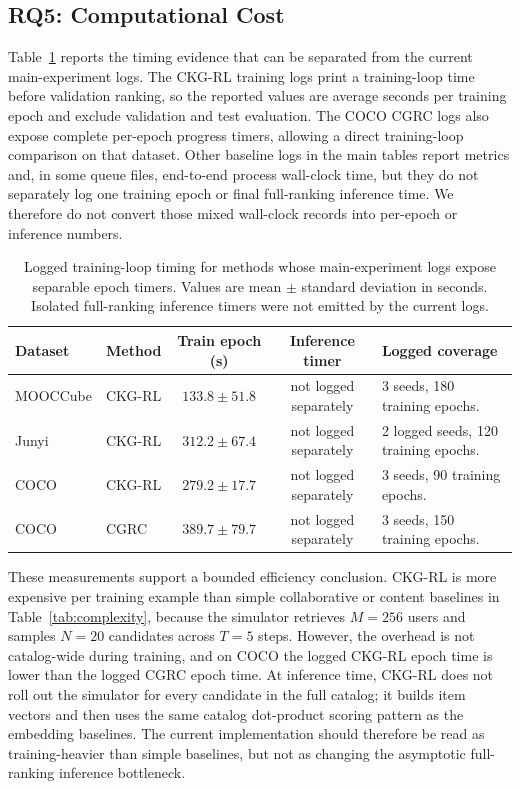 \documentclass[sigconf,anonymous,review]{acmart}
\begin{document}
\subsection{RQ5: Computational Cost}
Table~\ref{tab:runtime} reports the timing evidence that can be separated from the current main-experiment logs. The CKG-RL training logs print a training-loop time before validation ranking, so the reported values are average seconds per training epoch and exclude validation and test evaluation. The COCO CGRC logs also expose complete per-epoch progress timers, allowing a direct training-loop comparison on that dataset. Other baseline logs in the main tables report metrics and, in some queue files, end-to-end process wall-clock time, but they do not separately log one training epoch or final full-ranking inference time. We therefore do not convert those mixed wall-clock records into per-epoch or inference numbers.

\begin{table}[t]
\centering
\caption{Logged training-loop timing for methods whose main-experiment logs expose separable epoch timers. Values are mean \(\pm\) standard deviation in seconds. Isolated full-ranking inference timers were not emitted by the current logs.}
\label{tab:runtime}
\small
\setlength{\tabcolsep}{4.0pt}
\renewcommand{\arraystretch}{1.08}
\begin{tabular}{llccp{5.2cm}}
\toprule
Dataset & Method & Train epoch (s) & Inference timer & Logged coverage \\
\midrule
MOOCCube & CKG-RL & \(133.8\pm51.8\) & not logged separately & 3 seeds, 180 training epochs. \\
Junyi & CKG-RL & \(312.2\pm67.4\) & not logged separately & 2 logged seeds, 120 training epochs. \\
COCO & CKG-RL & \(279.2\pm17.7\) & not logged separately & 3 seeds, 90 training epochs. \\
COCO & CGRC~\cite{kim2024cgrc} & \(389.7\pm79.7\) & not logged separately & 3 seeds, 150 training epochs. \\
\bottomrule
\end{tabular}
\end{table}

These measurements support a bounded efficiency conclusion. CKG-RL is more expensive per training example than simple collaborative or content baselines in Table~\ref{tab:complexity}, because the simulator retrieves \(M=256\) users and samples \(N=20\) candidates across \(T=5\) steps. However, the overhead is not catalog-wide during training, and on COCO the logged CKG-RL epoch time is lower than the logged CGRC epoch time. At inference time, CKG-RL does not roll out the simulator for every candidate in the full catalog; it builds item vectors and then uses the same catalog dot-product scoring pattern as the embedding baselines. The current implementation should therefore be read as training-heavier than simple baselines, but not as changing the asymptotic full-ranking inference bottleneck.
\end{document}
